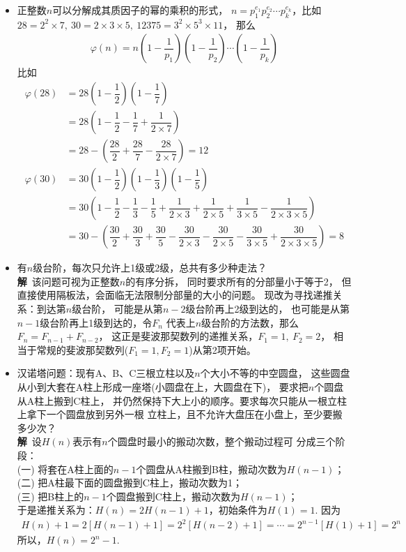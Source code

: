 \begin{itemize}[leftmargin=\inteval{\myitemleftmargin}pt,itemsep=
   \inteval{\myitemitempsep}pt,topsep=\inteval{\myitemtopsep}pt]
\item 正整数$ n $可以分解成其质因子的幂的乘积的形式，
$ n=p_1^{e_1}p_2^{e_2}\cdots p_k^{e_k} $，比如
$ 28=2^2\times 7,\ 30=2\times 3\times 5,\ 12375=3^2\times 5^3 \times 11 $，
那么
\begin{gather}\label{eulerPhi函数的计算公式}
    \varphi(n)=n\left(1-\dfrac{1}{p_1}\right)
    \left(1-\dfrac{1}{p_2}\right)\cdots \left(1-\dfrac{1}{p_k}\right)
\end{gather}
比如
\begin{align*}
    \varphi(28)&=28\left(1-\dfrac{1}{2}\right)\left(1-
    \dfrac{1}{7}\right) \\
    &=28\left(1-\dfrac{1}{2}-\dfrac{1}{7}+\dfrac{1}{2\times 7}\right) \\
    &=28-\left(\dfrac{28}{2}+\dfrac{28}{7}-\dfrac{28}{2\times 7}
    \right)=12 \\
    \varphi(30)&=30\left(1-\dfrac{1}{2}\right)
    \left(1-\dfrac{1}{3}\right)\left(1-\dfrac{1}{5}\right) \\
    &=30\left(1-\dfrac{1}{2}-\dfrac{1}{3}-\dfrac{1}{5}+
    \dfrac{1}{2\times 3}+\dfrac{1}{2\times 5}+\dfrac{1}{3\times 5}
    -\dfrac{1}{2\times 3\times 5}\right) \\
    &=30-\left(\dfrac{30}{2}+\dfrac{30}{3}+\dfrac{30}{5}-
    \dfrac{30}{2\times 3}-\dfrac{30}{2\times 5}-\dfrac{30}{3\times 5}
    +\dfrac{30}{2\times 3\times 5}\right)
    =8
\end{align*}

\item 有$ n $级台阶，每次只允许上1级或2级，总共有多少种走法？\\
\textbf{解}\ 该问题可视为正整数$ n $的有序分拆，
同时要求所有的分部量小于等于2，
但直接使用隔板法，会面临无法限制分部量的大小的问题。
现改为寻找递推关系：到达第$ n $级台阶，
可能是从第$ n-2 $级台阶再上2级到达的，
也可能是从第$ n-1 $级台阶再上1级到达的，令$ F_n $
代表上$ n $级台阶的方法数，那么$ F_n=F_{n-1}+F_{n-2} $，
这正是斐波那契数列的递推关系，$ F_1=1,\ F_2=2 $，
相当于常规的斐波那契数列($ F_1=1,F_2=1 $)从第2项开始。

\item 汉诺塔问题：现有A、B、C三根立柱以及$ n $个大小不等的中空圆盘，
这些圆盘从小到大套在A柱上形成一座塔(小圆盘在上，大圆盘在下)，
要求把$ n $个圆盘从A柱上搬到C柱上，
并仍然保持下大上小的顺序。要求每次只能从一根立柱上拿下一个圆盘放到另外一根
立柱上，且不允许大盘压在小盘上，至少要搬多少次？\\
\textbf{解}\ 设$ H(n) $表示有$ n $个圆盘时最小的搬动次数，整个搬动过程可
分成三个阶段：\\
(一) 将套在A柱上面的$ n-1 $个圆盘从A柱搬到B柱，搬动次数为$ H(n-1) $；\\
(二) 把A柱最下面的圆盘搬到C柱上，搬动次数为1；\\
(三) 把B柱上的$ n-1 $个圆盘搬到C柱上，搬动次数为$ H(n-1) $；\\
于是递推关系为：$ H(n)=2H(n-1)+1 $，初始条件为$ H(1)=1 $. 因为
\begin{align*}
    H(n)+1=2[H(n-1)+1]=2^2[H(n-2)+1]=\cdots=2^{n-1}[H(1)+1]=2^n
\end{align*}
所以，$ H(n)=2^n-1 $. 


\end{itemize}
